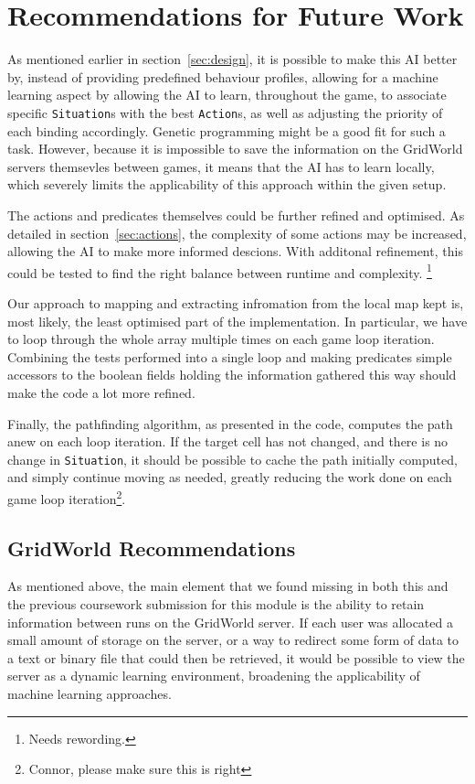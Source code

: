 \documentclass[11pt]{article}
\begin{document}
\section{Recommendations for Future Work} \label{sec:futureWork}

As mentioned earlier in section~\ref{sec:design}, it is possible to make this AI better by, instead of providing predefined behaviour profiles, allowing for a machine learning aspect by allowing the AI to learn, throughout the game, to associate specific \verb|Situation|s with the best \verb|Action|s, as well as adjusting the priority of each binding accordingly. Genetic programming might be a good fit for such a task. However, because it is impossible to save the information on the GridWorld servers themsevles between games, it means that the AI has to learn locally, which severely limits the applicability of this approach within the given setup.

The actions and predicates themselves could be further refined and optimised. As detailed in section~\ref{sec:actions}, the complexity of some actions may be increased, allowing the AI to make more informed descions. With additonal refinement, this could be tested to find the right balance between runtime and complexity. \footnote{Needs rewording.}

Our approach to mapping and extracting infromation from the local map kept is, most likely, the least optimised part of the implementation. In particular, we have to loop through the whole array multiple times on each game loop iteration. Combining the tests performed into a single loop and making predicates simple accessors to the boolean fields holding the information gathered this way should make the code a lot more refined.

Finally, the pathfinding algorithm, as presented in the code, computes the path anew on each loop iteration. If the target cell has not changed, and there is no change in \verb|Situation|, it should be possible to cache the path initially computed, and simply continue moving as needed, greatly reducing the work done on each game loop iteration\footnote{Connor, please make sure this is right}.

\subsection{GridWorld Recommendations}
As mentioned above, the main element that we found missing in both this and the previous coursework submission for this module is the ability to retain information between runs on the GridWorld server. If each user was allocated a small amount of storage on the server, or a way to redirect some form of data to a text or binary file that could then be retrieved, it would be possible to view the server as a dynamic learning environment, broadening the applicability of machine learning approaches.
\end{document}
